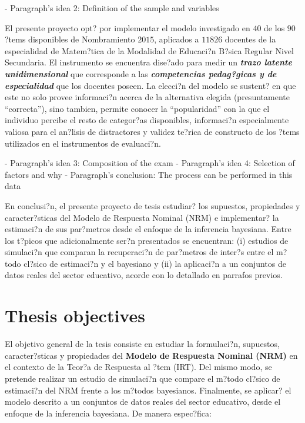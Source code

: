 - Paragraph's idea 2: Definition of the sample and variables

El presente proyecto opt? por implementar el modelo investigado en $40$ de los $90$ ?tems disponibles de Nombramiento $2015$, aplicados a $11826$ docentes de la especialidad de Matem?tica de la Modalidad de Educaci?n B?sica Regular Nivel Secundaria. El instrumento se encuentra dise?ado para medir un \textbf{\textit{trazo latente unidimensional}} que corresponde a las \textbf{\textit{competencias pedag?gicas y de especialidad}} que los docentes poseen. La elecci?n del modelo se sustent? en que este no solo provee informaci?n acerca de la alternativa elegida (presuntamente ``correcta''), sino tambien, permite conocer la ``popularidad'' con la que el individuo percibe el resto de categor?as disponibles, informaci?n especialmente valiosa para el an?lisis de distractores y validez te?rica de constructo de los ?tems utilizados en el instrumentos de evaluaci?n.

- Paragraph's idea 3: Composition of the exam
- Paragraph's idea 4: Selection of factors and why
- Paragraph's conclusion: The process can be performed in this data

En conclusi?n, el presente proyecto de tesis estudiar? los supuestos, propiedades y caracter?sticas del Modelo de Respuesta Nominal (NRM) e implementar? la estimaci?n de sus par?metros desde el enfoque de la  inferencia bayesiana. Entre los t?picos que adicionalmente ser?n presentados se encuentran: (i) estudios de simulaci?n que comparan la recuperaci?n de par?metros de inter?s entre el m?todo cl?sico de estimaci?n y el bayesiano y (ii) la aplicaci?n a un conjuntos de datos reales del sector educativo, acorde con lo detallado en parrafos previos.



\section{Thesis objectives}

El objetivo general de la tesis consiste en estudiar la formulaci?n, supuestos, caracter?sticas y propiedades del \textbf{Modelo de Respuesta Nominal (NRM)}   en el contexto de la Teor?a de Respuesta al ?tem (IRT). Del mismo modo, se pretende realizar un estudio de simulaci?n que compare el m?todo cl?sico de estimaci?n del NRM frente a los m?todos bayesianos. Finalmente, se aplicar? el modelo descrito a un conjuntos de datos reales del sector educativo, desde el enfoque de la inferencia bayesiana. De manera espec?fica:

